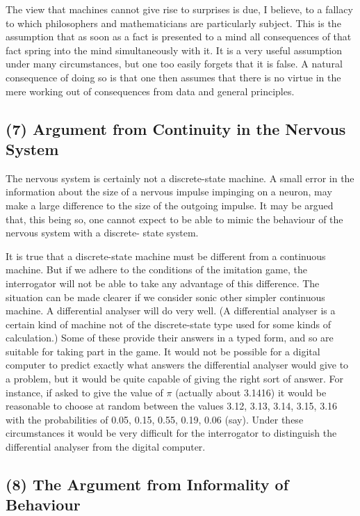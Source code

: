 \documentclass[10pt,twoside,openright]{memoir}
\begin{document}
The view that machines cannot give rise to surprises is due, I believe, to a fallacy to which philosophers and mathematicians are particularly subject. This is the assumption that as soon as a fact is presented to a mind all consequences of that fact spring into the mind simultaneously with it. It is a very useful assumption under many circumstances, but one too easily forgets that it is false. A natural consequence of doing so is that one then assumes that there is no virtue in the mere working out of consequences from data and general principles.

\subsection{(7) Argument from Continuity in the Nervous System}

The nervous system is certainly not a discrete-state machine. A small error in the information about the size of a nervous impulse impinging on a neuron, may make a large difference to the size of the outgoing impulse. It may be argued that, this being so, one cannot expect to be able to mimic the behaviour of the nervous system with a discrete- state system.

It is true that a discrete-state machine must be different from a continuous machine. But if we adhere to the conditions of the imitation game, the interrogator will not be able to take any advantage of this difference. The situation can be made clearer if we consider sonic other simpler continuous machine. A differential analyser will do very well. (A differential analyser is a certain kind of machine not of the discrete-state type used for some kinds of calculation.) Some of these provide their answers in a typed form, and so are suitable for taking part in the game. It would not be possible for a digital computer to predict exactly what answers the differential analyser would give to a problem, but it would be quite capable of giving the right sort of answer. For instance, if asked to give the value of $\pi$ (actually about 3.1416) it would be reasonable to choose at random between the values 3.12, 3.13, 3.14, 3.15, 3.16 with the probabilities of 0.05, 0.15, 0.55, 0.19, 0.06 (say). Under these circumstances it would be very difficult for the interrogator to distinguish the differential analyser from the digital computer.

\subsection{(8) The Argument from Informality of Behaviour}
\end{document}
